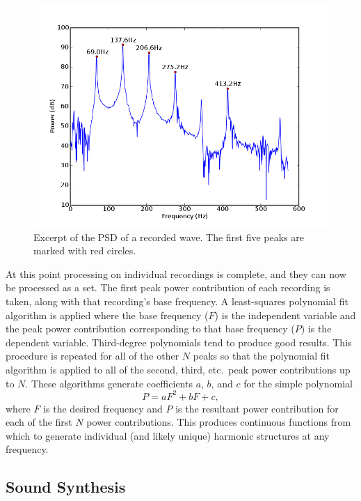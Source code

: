 \documentclass[twocolumn]{article}
\begin{document}
\begin{figure}
\centering
\includegraphics[width=\linewidth]{figures/recording-peaks.png}
\caption{Excerpt of the PSD of a recorded wave. The first five peaks are marked with red circles.}
\label{peaks}
\end{figure}

At this point processing on individual recordings is complete, and they can now be processed as a set. The first peak power contribution of each recording is taken, along with that recording's base frequency. A least-squares polynomial fit algorithm is applied where the base frequency ($F$) is the independent variable and the peak power contribution corresponding to that base frequency ($P$) is the dependent variable. Third-degree polynomials tend to produce good results. This procedure is repeated for all of the other $N$ peaks so that the polynomial fit algorithm is applied to all of the second, third, etc.\ peak power contributions up to $N$. These algorithms generate coefficients $a$, $b$, and $c$ for the simple polynomial \begin{equation} \label{eq:power} P = aF^2 + bF + c,\end{equation} where $F$ is the desired frequency and $P$ is the resultant power contribution for each of the first $N$ power contributions. This produces continuous functions from which to generate individual (and likely unique) harmonic structures at any frequency.

\subsection{Sound Synthesis}
\end{document}
